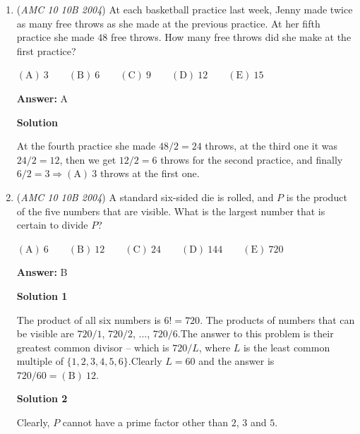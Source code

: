 \begin{enumerate}
 $90$ (The total number of two-digit numbers) $-  72$ (The number of two-digit numbers without a $7$) $= 18 \Rightarrow$ $\boxed{\mathrm{(B)}\ 18}$.

 Note: the problem where this is linked is covered 0:15-1:00 (and it covers the probability of satisfying the problem's conditions as well).

 


	\item (\textit{AMC 10 10B 2004}) At each basketball practice last week, Jenny made twice as many free throws as she made at the previous practice. At her fifth practice she made $48$ free throws. How many free throws did she make at the first practice?


 $\mathrm{(A) \ } 3 \qquad \mathrm{(B) \ } 6 \qquad \mathrm{(C) \ } 9 \qquad \mathrm{(D) \ } 12\qquad \mathrm{(E) \ } 15$

 \textbf{Answer: }A



\textbf{Solution}

At the fourth practice she made $48/2=24$ throws, at the third one it was $24/2=12$, then we get $12/2=6$ throws for the second practice, and finally $6/2=3\Rightarrow\boxed{\mathrm{(A)}\ 3}$ throws at the first one.

 


	\item (\textit{AMC 10 10B 2004}) A standard six-sided die is rolled, and $P$ is the product of the five numbers that are visible. What is the largest number that is certain to divide $P$?


 $\mathrm{(A) \ } 6 \qquad \mathrm{(B) \ } 12 \qquad \mathrm{(C) \ } 24 \qquad \mathrm{(D) \ } 144\qquad \mathrm{(E) \ } 720$

 \textbf{Answer: }B



\textbf{Solution 1}

The product of all six numbers is $6!=720$. The products of numbers that can be visible are $720/1$, $720/2$, ..., $720/6$.The answer to this problem is their greatest common divisor -- which is $720/L$, where $L$ is the least common multiple of $\{1,2,3,4,5,6\}$.Clearly $L=60$ and the answer is $720/60=\boxed{\mathrm{(B)}\ 12}$.

 



\textbf{Solution 2}

Clearly, $P$ cannot have a prime factor other than $2$, $3$ and $5$.


\end{enumerate}
